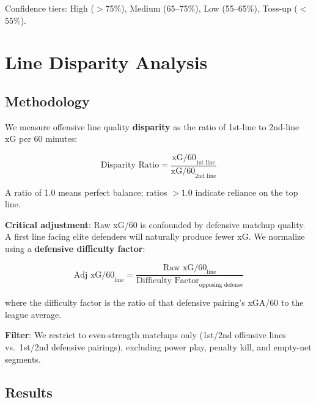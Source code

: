 \documentclass[11pt, a4paper]{article}
\begin{document}
\noindent Confidence tiers: High ($>$75\%), Medium (65--75\%), Low (55--65\%), Toss-up ($<$55\%).

\section{Line Disparity Analysis}
\label{sec:disparity}

\subsection{Methodology}

We measure offensive line quality \textbf{disparity} as the ratio of 1st-line to 2nd-line xG per 60 minutes:

\begin{equation}
\text{Disparity Ratio} = \frac{\text{xG/60}_{\text{1st line}}}{\text{xG/60}_{\text{2nd line}}}
\end{equation}

A ratio of 1.0 means perfect balance; ratios $> 1.0$ indicate reliance on the top line.

\textbf{Critical adjustment}: Raw xG/60 is confounded by defensive matchup quality. A first line facing elite defenders will naturally produce fewer xG. We normalize using a \textbf{defensive difficulty factor}:

\begin{equation}
\text{Adj xG/60}_{\text{line}} = \frac{\text{Raw xG/60}_{\text{line}}}{\text{Difficulty Factor}_{\text{opposing defense}}}
\end{equation}

where the difficulty factor is the ratio of that defensive pairing's xGA/60 to the league average.

\textbf{Filter}: We restrict to even-strength matchups only (1st/2nd offensive lines vs.\ 1st/2nd defensive pairings), excluding power play, penalty kill, and empty-net segments.

\subsection{Results}
\end{document}
